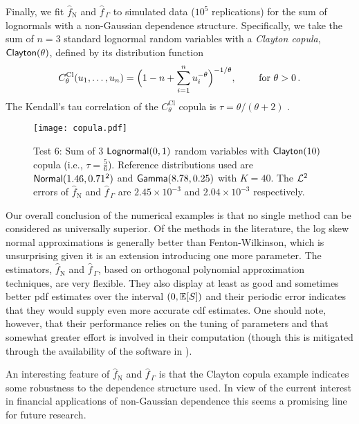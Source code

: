 Finally, we fit $\widehat{f}_{\mathrm{N}}$ and $\widehat{f}_{\,\Gamma}$ to simulated data ($10^5$ replications) for the sum of lognormals with a non-Gaussian dependence structure. Specifically, we take the sum of $n = 3$ standard lognormal random variables with a \emph{Clayton copula}, $\mathsf{Clayton}(\theta)$, defined by its distribution function
\[
C^{\text{Cl}}_\theta(u_1, \dots, u_n) = \Bigl( 1 - n + \sum_{i=1}^n u_i^{-\theta} \Bigr)^{-1/\theta}, \qquad \text{ for } \theta > 0 \,.
\]
The Kendall's tau correlation of the $C^{\text{Cl}}_\theta$ copula is $\tau = \theta / (\theta + 2)$ \cite{mcneil2015quantitative}.

\begin{figure}
\centering
\texttt{[image: copula.pdf]}
\caption*{Test 6: Sum of 3 $\mathsf{Lognormal}(0,1)$ random variables with $\mathsf{Clayton}(10)$ copula (i.e., $\tau = \frac56$). Reference distributions used are $\mathsf{Normal}(1.46,0.71^2)$ and $\mathsf{Gamma}(8.78,0.25)$ with $K = 40$. The $\mathcal{L}^2$ errors of $\widehat{f}_{\mathrm{N}}$ and $\widehat{f}_{\,\Gamma}$ are $2.45 \times 10^{-3}$ and $2.04 \times 10^{-3}$ respectively.}
\end{figure}


Our overall conclusion of the numerical examples is that no single method can
be considered as universally superior. Of the methods in the literature,
the log skew normal approximations is generally better than Fenton-Wilkinson,
which is unsurprising given it is an extension introducing one more parameter.
The estimators, $\widehat{f}_{\mathrm{N}}$ and $\widehat{f}_{\,\Gamma}$, based on orthogonal polynomial approximation techniques, are very flexible. They also display at least as good and sometimes better pdf estimates over the interval $(0, \operatorname{{\mathbb E}}[S])$ and their periodic error indicates that they would supply even more accurate cdf estimates. One should note, however, that their
performance relies on the tuning of parameters and that somewhat
greater effort is involved in their computation (though this is mitigated through the availability
of the software in \cite{OrthogoCode}).

An interesting feature of $\widehat{f}_{\mathrm{N}}$ and $\widehat{f}_{\,\Gamma}$ is that
the Clayton copula example indicates some robustness to the dependence structure used.
In view of the current interest in financial applications of non-Gaussian dependence this
seems a promising line for future research.

